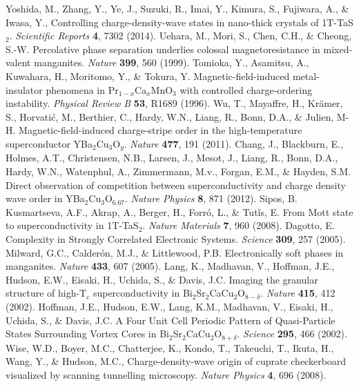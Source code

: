 \documentclass[12pt]{article}
\begin{document}
\begin{thebibliography}{99}
	Yoshida, M., Zhang, Y., Ye, J., Suzuki, R., Imai, Y., Kimura, S., Fujiwara, A., \& Iwasa, Y., Controlling charge-density-wave states in nano-thick crystals of 1T-TaS$_2$. \textit{Scientific Reports} \textbf{4}, 7302 (2014).
    Uehara, M., Mori, S., Chen, C.H., \& Cheong,  S.-W. Percolative phase separation underlies colossal magnetoresistance in mixed-valent manganites. \textit{Nature} \textbf{399}, 560 (1999).
    Tomioka, Y., Asamitsu, A., Kuwahara, H., Moritomo, Y., \& Tokura, Y. Magnetic-field-induced metal-insulator phenomena in Pr$_{1-x}$Ca$_x$MnO$_3$ with controlled charge-ordering instability. \textit{Physical Review B} \textbf{53}, R1689 (1996).
    Wu, T., Mayaffre, H., Kr\"{a}mer, S., Horvati\'{c}, M., Berthier, C., Hardy, W.N., Liang, R., Bonn, D.A., \& Julien, M-H. Magnetic-field-induced charge-stripe order in the high-temperature superconductor YBa$_2$Cu$_3$O$_y$. \textit{Nature} \textbf{477}, 191 (2011).
    Chang, J., Blackburn, E., Holmes, A.T., Christensen, N.B., Larsen, J., Mesot, J., Liang, R., Bonn, D.A., Hardy, W.N., Watenphul, A., Zimmermann, M.v., Forgan, E.M., \& Hayden, S.M. Direct observation of competition between superconductivity and charge density wave order in YBa$_2$Cu$_3$O$_{6.67}$. \textit{Nature Physics} \textbf{8}, 871 (2012).
	Sipos, B. Kusmartseva, A.F., Akrap, A., Berger, H., Forr\'{o}, L., \& Tut\v{i}s, E. From Mott state to superconductivity in 1T-TaS$_2$. \textit{Nature Materials} \textbf{7}, 960 (2008).
    Dagotto, E. Complexity in Strongly Correlated Electronic Systems. \textit{Science} \textbf{309}, 257 (2005).
    Milward, G.C., Calder\'{o}n, M.J., \& Littlewood, P.B. Electronically soft phases in manganites. \textit{Nature} \textbf{433}, 607 (2005).
    Lang, K., Madhavan, V., Hoffman, J.E., Hudson, E.W., Eisaki, H., Uchida, S., \& Davis, J.C. Imaging the granular structure of high-T$_c$ superconductivity in Bi$_2$Sr$_2$CaCu$_2$O$_{8-\delta}$. \textit{Nature} \textbf{415}, 412 (2002).
   	Hoffman, J.E., Hudson, E.W., Lang, K.M., Madhavan, V., Eisaki, H., Uchida, S., \& Davis, J.C. A Four Unit Cell Periodic Pattern of Quasi-Particle States Surrounding Vortex Cores in Bi$_2$Sr$_2$CaCu$_2$O$_{8+\delta}$. \textit{Science} \textbf{295}, 466 (2002).
	Wise, W.D., Boyer, M.C., Chatterjee, K., Kondo, T., Takeuchi, T., Ikuta, H., Wang, Y., \& Hudson, M.C., Charge-density-wave origin of cuprate checkerboard visualized by scanning tunnelling microscopy. \textit{Nature Physics} \textbf{4}, 696 (2008).

\end{thebibliography}
\end{document}
